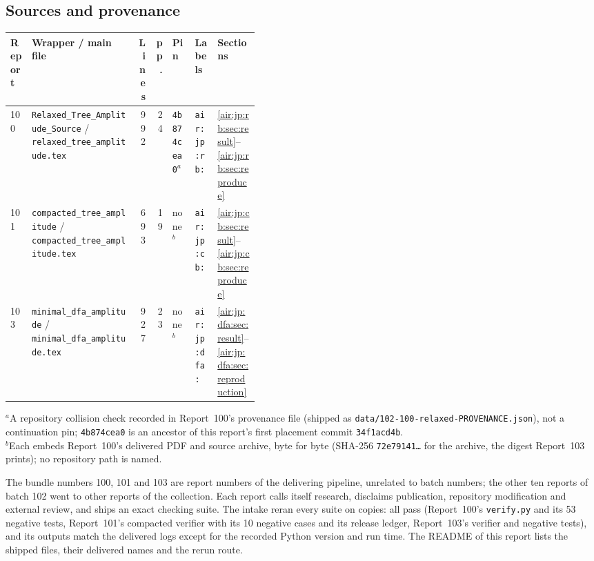 \documentclass[11pt,letterpaper]{article}
\numberwithin{equation}{section}
\theoremstyle{remark}
\newcommand{\repopath}[1]{\nolinkurl{#1}}
\begin{document}
\subsection{Sources and provenance}\label{air:jp:sec:provenance}
\begin{center}
\footnotesize\setlength{\tabcolsep}{3.5pt}
\begin{tabular}{@{}lp{0.42\linewidth}rrlll@{}}
\toprule
Report & Wrapper / main file & Lines & pp. & Pin & Labels & Sections\\
\midrule
100 & \repopath{Relaxed_Tree_Amplitude_Source} / \repopath{relaxed_tree_amplitude.tex} & 992 & 24 & \texttt{4b874cea0}$^{a}$ & \texttt{air:jp:rb:} & \ref{air:jp:rb:sec:result}--\ref{air:jp:rb:sec:reproduce}\\
101 & \repopath{compacted_tree_amplitude} / \repopath{compacted_tree_amplitude.tex} & 693 & 19 & none$^{b}$ & \texttt{air:jp:cb:} & \ref{air:jp:cb:sec:result}--\ref{air:jp:cb:sec:reproduce}\\
103 & \repopath{minimal_dfa_amplitude} / \repopath{minimal_dfa_amplitude.tex} & 927 & 23 & none$^{b}$ & \texttt{air:jp:dfa:} & \ref{air:jp:dfa:sec:result}--\ref{air:jp:dfa:sec:reproduction}\\
\bottomrule
\end{tabular}

\smallskip
\raggedright $^{a}$A repository collision check recorded in Report~100's provenance file (shipped as \repopath{data/102-100-relaxed-PROVENANCE.json}), not a continuation pin; \texttt{4b874cea0} is an ancestor of this report's first placement commit \texttt{34f1acd4b}.\\
$^{b}$Each embeds Report~100's delivered PDF and source archive, byte for byte (SHA-256 \texttt{72e79141\ldots} for the archive, the digest Report~103 prints); no repository path is named.
\end{center}
The bundle numbers 100, 101 and 103 are report numbers of the delivering pipeline, unrelated to batch numbers; the other ten reports of batch 102 went to other reports of the collection. Each report calls itself research, disclaims publication, repository modification and external review, and ships an exact checking suite. The intake reran every suite on copies: all pass (Report~100's \repopath{verify.py} and its 53 negative tests, Report~101's compacted verifier with its 10 negative cases and its release ledger, Report~103's verifier and negative tests), and its outputs match the delivered logs except for the recorded Python version and run time. The README of this report lists the shipped files, their delivered names and the rerun route.
\end{document}
